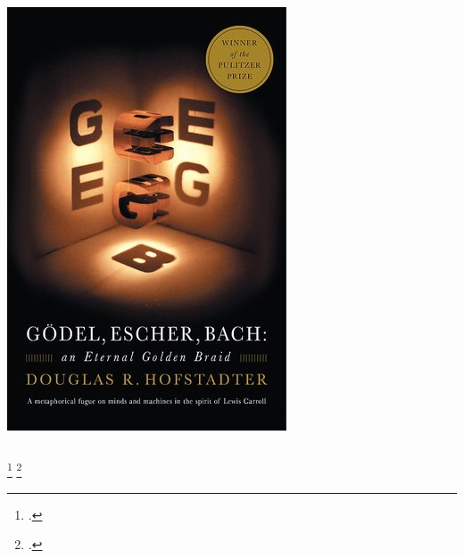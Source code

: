 \documentclass[
    9pt,
    hyperref={bookmarks=false, colorlinks=false}, %
    xcolor={dvipsnames},
]{beamer}
\begin{document}
\begin{frame}
\begin{columns}
\begin{column}{0.3\textwidth}
\begin{center}
                \includegraphics[width=\textwidth]{figures/geb_cover.jpg}
            \end{center}
        \end{column}
    \end{columns}
    \footcitetext{fritz2012entropic}
    \footcitetext{abramsky2011sheaf}
\end{frame}
\end{document}

